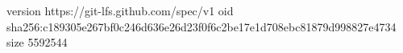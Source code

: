 version https://git-lfs.github.com/spec/v1
oid sha256:c189305e267bf0c246d636e26d23f0f6c2be17e1d708ebc81879d998827e4734
size 5592544
